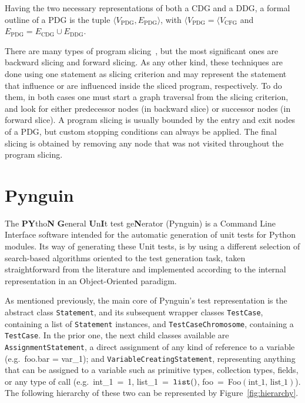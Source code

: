 \documentclass[%
  chapterprefix=false,%
  open=right,%
  twoside=true,%
  paper=a4,%
  logofile={Figures/logo.png},%
  thesistype=master,%
  UKenglish,%
]{se2thesis}
\newcommand{\classname}[1]{\texttt{#1}}
\newcommand{\callable}[2][]{\(\text{\texttt{#2}}(#1)\)}
\begin{document}
Having the two necessary representations of both a CDG and a DDG, a formal outline of a PDG is the tuple \(\langle V_{\text{PDG}}, E_{\text{PDG}} \rangle\), with \(\langle V_{\text{PDG}} = \langle V_{\text{CFG}}\) and \(E_{\text{PDG}} = E_{\text{CDG}} \cup E_{\text{DDG}}\).

There are many types of program slicing~\cite{DBLP:journals/csur/Silva12}, but the most significant ones are backward slicing and forward slicing.
As any other kind, these techniques are done using one statement as slicing criterion and may represent the statement that influence or are influenced inside the sliced program, respectively.
To do them, in both cases one must start a graph traversal from the slicing criterion, and look for either predecessor nodes (in backward slice) or successor nodes (in forward slice).
A program slicing is usually bounded by the entry and exit nodes of a PDG, but custom stopping conditions can always be applied.
The final slicing is obtained by removing any node that was not visited throughout the program slicing.


\newpage
\section{Pynguin}

The \textbf{PY}tho\textbf{N} \textbf{G}eneral \textbf{U}n\textbf{I}t test ge\textbf{N}erator (Pynguin) is a Command Line Interface software intended for the automatic generation of unit tests for Python modules.
Its way of generating these Unit tests, is by using a different selection of search-based algorithms oriented to the test generation task, taken straightforward from the literature and implemented according to the internal representation in an Object-Oriented paradigm.

As mentioned previously, the main core of Pynguin's test representation is the abstract class \classname{Statement}, and its subsequent wrapper classes \classname{TestCase}, containing a list of \classname{Statement} instances, and \classname{TestCaseChromosome}, containing a \classname{TestCase}.
In the prior one, the next child classes available are \classname{AssignmentStatement}, a direct assignment of any kind of reference to a variable (e.g.~foo.bar = var\_1); and \classname{VariableCreatingStatement}, representing anything that can be assigned to a variable such as primitive types, collection types, fields, or any type of call (e.g.~int\_1~=~1, list\_1~=~\callable{list}, foo~=~Foo\((\text{int\_1,~list\_1})\)).
The following hierarchy of these two can be represented by Figure~\ref{fig:hierarchy}.
\end{document}
